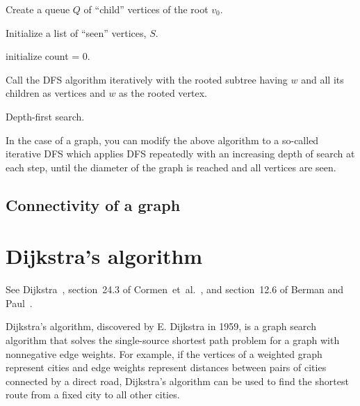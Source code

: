 \begin{algorithm}[!htpb]
\SetLine
\dontprintsemicolon  %
\BlankLine
Create a queue $Q$ of ``child'' vertices of the root $v_0$. 

Initialize a list of ``seen'' vertices, $S$.

initialize count = 0.


Call the DFS algorithm iteratively with the
rooted subtree having $w$ and all its children as
vertices and $w$ as the rooted vertex.
\caption{Depth-first search.}
\label{alg:chapter2:DFS}
\end{algorithm}

In the case of a graph, you can modify the above algorithm to
a so-called iterative DFS which applies DFS repeatedly with an
increasing depth of search at each step, until the diameter of the
graph is reached and all vertices are seen.

\subsection{Connectivity of a graph}




\section{Dijkstra's algorithm}

See Dijkstra~\cite{Dijkstra1959}, section~24.3 of
Cormen~et~al.~\cite{CormenEtAl2001}, and section~12.6 of Berman and
Paul~\cite{BermanPaul1997}.

Dijkstra's algorithm, discovered by E. Dijkstra in 1959, is a graph 
search algorithm that solves the single-source shortest path problem 
for a graph with nonnegative edge weights. 
For example, if the vertices of a weighted graph represent cities and edge
weights represent distances between pairs of cities
connected by a direct road, Dijkstra's algorithm can be used to find
the shortest route from a fixed city to all other cities.


